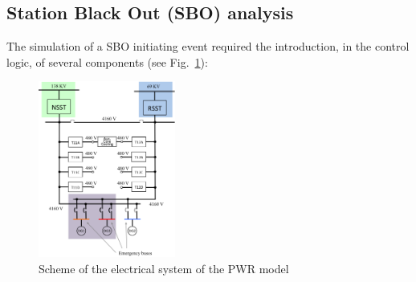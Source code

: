 \subsection{Station Black Out (SBO) analysis}
\label{sec:SBOanalysis}
The simulation of a SBO initiating event required the introduction, in the control logic, of several components (see Fig.~\ref{fig:SchemeElSystem}):
\begin{figure}[h]
   \centering
    \includegraphics[width=0.4\textwidth]{figures/SchemeEletricalSystem.png}
    \caption{Scheme of the electrical system of the PWR model}
    \label{fig:SchemeElSystem}
\end{figure}

